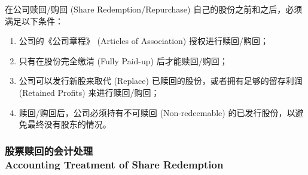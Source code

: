 \documentclass{article}
\begin{document}
\noindent 在公司赎回/购回 (Share Redemption/Repurchase) 自己的股份之前和之后，必须满足以下条件：

\begin{enumerate}[label=\alph*)]
    \item 公司的《公司章程》 (Articles of Association) 授权进行赎回/购回；
    \item 只有在股份完全缴清 (Fully Paid-up) 后才能赎回/购回；
    \item 公司可以发行新股来取代 (Replace) 已赎回的股份，或者拥有足够的留存利润 (Retained Profits) 来进行赎回/购回；
    \item 赎回/购回后，公司必须持有不可赎回 (Non-redeemable) 的已发行股份，以避免最终没有股东的情况。
\end{enumerate}

\subsubsection{股票赎回的会计处理\\Accounting Treatment of Share Redemption}
\end{document}

